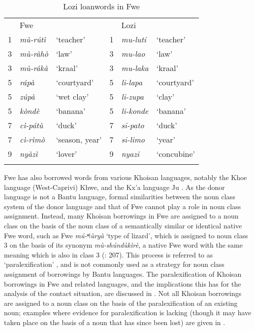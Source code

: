 \begin{table}
\label{bkm:Ref492118585}\caption{\label{tab:4:3}Lozi loanwords in Fwe}
\begin{tabular}{llllll}
\lsptoprule
& Fwe &  &  & Lozi & \\\cmidrule(lr){1-3}\cmidrule(lr){4-6}
1 & \textit{mù-rútì} & ‘teacher’ & 1 & \textit{mu-luti} & ‘teacher’\\
3 & \textit{mù-ràhò} & ‘law’ & 3 & \textit{mu-lao} & ‘law’\\
3 & \textit{mù-râkà} & ‘kraal’ & 3 & \textit{mu-laka} & ‘kraal’\\
5 & \textit{rápà} & ‘courtyard’ & 5 & \textit{li-lapa} & ‘courtyard’\\
5 & \textit{zúpà} & ‘wet clay’ & 5 & \textit{li-zupa} & ‘clay’\\
5 & \textit{kòndè} & ‘banana’ & 5 & \textit{li-konde} & ‘banana’\\
7 & \textit{cì-pátù} & ‘duck’ & 7 & \textit{si-pato} & ‘duck’\\
7 & \textit{cì-rìmò} & ‘season, year’ & 7 & \textit{si-limo} & ‘year’\\
9 & \textit{nyàzì} & ‘lover’ & 9 & \textit{nyazi} & ‘concubine’\\
\lspbottomrule
\end{tabular}
\end{table}

Fwe has also borrowed words from various Khoisan languages, notably the Khoe language (West-Caprivi) Khwe, and the Kx’a language Ju \citep{GunninkEtAl2015}. As the donor language is not a Bantu language, formal similarities between the noun class system of the donor language and that of Fwe cannot play a role in noun class assignment. Instead, many Khoisan borrowings in Fwe are assigned to a noun class on the basis of the noun class of a semantically similar or identical native Fwe word, such as Fwe \textit{mú-ⁿǀùryà} ‘type of lizard’, which is assigned to noun class 3 on the basis of its synonym \textit{mù-shúndùkìrè}, a native Fwe word with the same meaning which is also in class 3 (\citealt{GunninkEtAl2015}: 207). This process is referred to as ‘paralexification’ \citep{Mous2001}, and is not commonly used as a strategy for noun class assignment of borrowings by Bantu languages. The paralexification of Khoisan borrowings in Fwe and related languages, and the implications this has for the analysis of the contact situation, are discussed in {\citet{GunninkEtAl2015}}. Not all Khoisan borrowings are assigned to a noun class on the basis of the paralexification of an existing noun; examples where evidence for paralexification is lacking (though it may have taken place on the basis of a noun that has since been lost) are given in .

